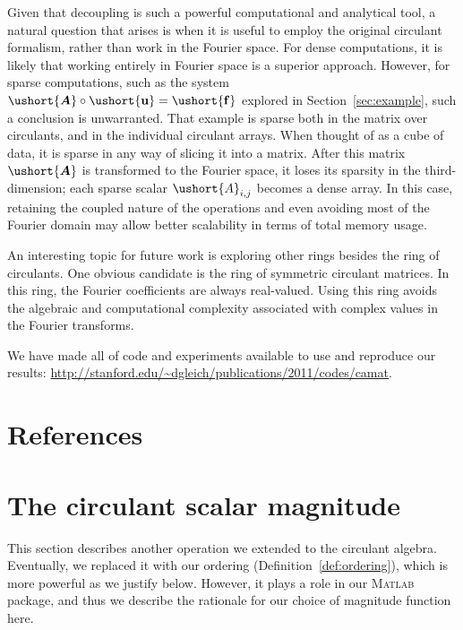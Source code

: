 \documentclass[1p,authoryear,letterpaper]{elsarticle}
\providecommand{\mat}{\boldsymbol}
\renewcommand{\vec}{\mathbf}
\newcommand{\cel}[1]{\ushort{#1}}
\newcommand{\celm}[1]{\cel{\mat{#1}}}
\newcommand{\celv}[1]{\cel{\vec{#1}}}
\newcommand{\cvf}{\ensuremath{\celv{f}}}
\newcommand{\cvu}{\ensuremath{\celv{u}}}
\providecommand{\cmA}{\ensuremath{\celm{A}}}
\newcommand{\Matlab}{\textsc{Matlab}\xspace}
\begin{document}
Given that decoupling is such a powerful computational
and analytical tool, a natural question that arises is when 
it is useful to employ the original circulant formalism, rather than work in the Fourier space.
For dense computations, it is likely that working entirely
in Fourier space is a superior approach.  However, for sparse computations,
such as the system $\cmA \circ \cvu = \cvf$ explored in
Section~\ref{sec:example}, such a conclusion is unwarranted.
That example is sparse both in the matrix over circulants,
and in the individual circulant arrays.  When thought of
as a cube of data, it is sparse in any way of slicing it
into a matrix. After this matrix $\cmA$ is transformed
to the Fourier space, it loses its sparsity in the
third-dimension; each sparse scalar $\cel{A}_{i,j}$
becomes a dense array. In this case, retaining the coupled
nature of the operations and even avoiding most of the
Fourier domain may allow better scalability in terms
of total memory usage.


An interesting topic for future work is exploring other
rings besides the ring of circulants.  One obvious
candidate is the ring of symmetric circulant matrices.
In this ring, the Fourier coefficients are always
real-valued.  Using this ring avoids the algebraic and computational complexity
associated with complex values in the Fourier transforms.

We have made all of code and experiments available
to use and reproduce our results:
\url{http://stanford.edu/~dgleich/publications/2011/codes/camat}.



\section*{References}




\appendix

\section{The circulant scalar magnitude}
\label{sec:magnitude}

This section describes another operation
we extended to the circulant algebra.  Eventually,
we replaced it with our ordering (Definition~\ref{def:ordering}),
which is more powerful as we justify below.
However, it plays
a role in our \Matlab package, and thus we describe
the rationale for our choice of magnitude function here.
\end{document}
